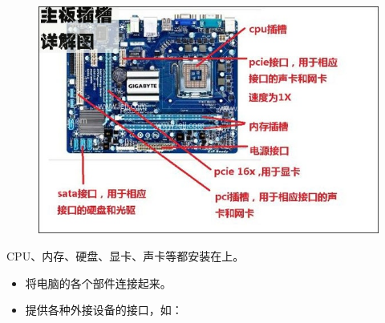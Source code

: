 \begin{frame}[fragile]
\begin{figure}[h] 
	\centering
	\includegraphics[width=\textwidth]{ch01/fig/mobo}
\end{figure}
\end{frame}


\begin{frame}
{CPU、内存、硬盘、显卡、声卡等都安装在上。}

\begin{itemize}
\item
将电脑的各个部件连接起来。 \\[0.1in]
\item
提供各种外接设备的接口，如：
\end{itemize}
\end{frame}






